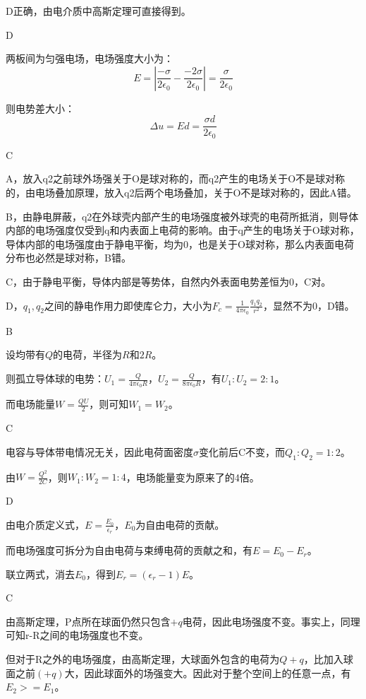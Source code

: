 \documentclass[b5paper,opensource,sourcefont,parskip]{qyxf-book}
\begin{document}
D正确，由电介质中高斯定理可直接得到。

D

\solve 两板间为匀强电场，电场强度大小为：
\[E=\left|\frac{-\sigma}{2\epsilon_0}-\frac{-2\sigma}{2\epsilon_0}\right|=\frac{\sigma}{2\epsilon_0}\]

则电势差大小：
\[\Delta u=Ed=\frac{\sigma d}{2\epsilon_0}\]

C

\solve A，放入q2之前球外场强关于O是球对称的，而q2产生的电场关于O不是球对称的，由电场叠加原理，放入q2后两个电场叠加，关于O不是球对称的，因此A错。

B，由静电屏蔽，q2在外球壳内部产生的电场强度被外球壳的电荷所抵消，则导体内部的电场强度仅受到q和内表面上电荷的影响。由于q产生的电场关于O球对称，导体内部的电场强度由于静电平衡，均为0，也是关于O球对称，那么内表面电荷分布也必然是球对称，B错。

C，由于静电平衡，导体内部是等势体，自然内外表面电势差恒为0，C对。

D，$ q_1,q_2 $之间的静电作用力即使库仑力，大小为$ F_c=\frac{1}{4\pi\epsilon_0}\frac{q_1q_2}{r^2} $，显然不为0，D错。

B

\solve 设均带有$ Q $的电荷，半径为$ R $和$ 2R $。

则孤立导体球的电势：$ U_1=\frac{Q}{4\pi\epsilon_0R} $，$ U_2=\frac{Q}{8\pi\epsilon_0R} $，有$ U_1:U_2=2:1 $。

而电场能量$ W=\frac{QU}{2} $，则可知$ W_1=W_2 $。

C

\solve 电容与导体带电情况无关，因此电荷面密度$ \sigma $变化前后C不变，而$ Q_1:Q_2=1:2 $。

由$ W=\frac{Q^2}{2C} $，则$ W_1:W_2=1:4 $，电场能量变为原来了的4倍。

D

\solve 由电介质定义式，$ E=\frac{E_0}{\epsilon_r} $，$ E_0 $为自由电荷的贡献。

而电场强度可拆分为自由电荷与束缚电荷的贡献之和，有$ E=E_0-E_r $。

联立两式，消去$ E_0 $，得到$ E_r=(\epsilon_r-1)E $。

C

\solve 由高斯定理，P点所在球面仍然只包含$ +q $电荷，因此电场强度不变。事实上，同理可知r-R之间的电场强度也不变。

但对于R之外的电场强度，由高斯定理，大球面外包含的电荷为$ Q+q $，比加入球面之前$ (+q) $大，因此球面外的场强变大。因此对于整个空间上的任意一点，有$ E_2>=E_1 $。
\end{document}
